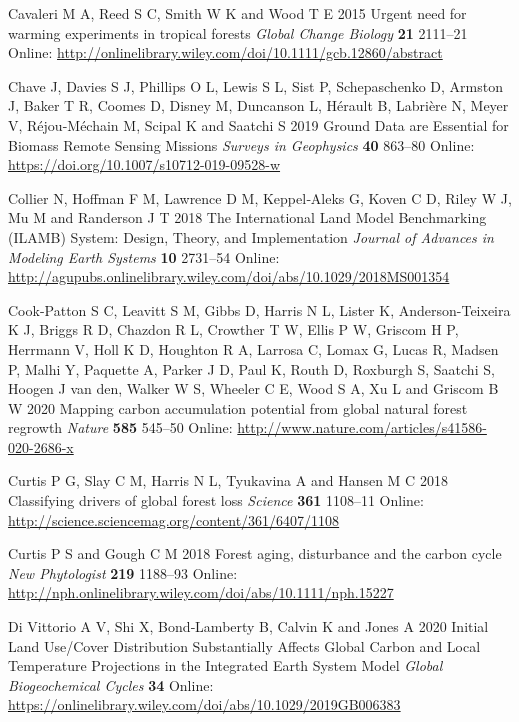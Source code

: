 \documentclass[
]{article}
\newlength{\cslhangindent}
\newenvironment{cslreferences}%
  {\setlength{\parindent}{0pt}%
  \everypar{\setlength{\hangindent}{\cslhangindent}}\ignorespaces}%
  {\par}
\begin{document}
\begin{cslreferences}
\leavevmode\hypertarget{ref-cavaleri_urgent_2015}{}%
Cavaleri M A, Reed S C, Smith W K and Wood T E 2015 Urgent need for
warming experiments in tropical forests \emph{Global Change Biology}
\textbf{21} 2111--21 Online:
\url{http://onlinelibrary.wiley.com/doi/10.1111/gcb.12860/abstract}

\leavevmode\hypertarget{ref-chave_ground_2019}{}%
Chave J, Davies S J, Phillips O L, Lewis S L, Sist P, Schepaschenko D,
Armston J, Baker T R, Coomes D, Disney M, Duncanson L, Hérault B,
Labrière N, Meyer V, Réjou-Méchain M, Scipal K and Saatchi S 2019 Ground
Data are Essential for Biomass Remote Sensing Missions \emph{Surveys in
Geophysics} \textbf{40} 863--80 Online:
\url{https://doi.org/10.1007/s10712-019-09528-w}

\leavevmode\hypertarget{ref-collier_international_2018}{}%
Collier N, Hoffman F M, Lawrence D M, Keppel‐Aleks G, Koven C D, Riley W
J, Mu M and Randerson J T 2018 The International Land Model Benchmarking
(ILAMB) System: Design, Theory, and Implementation \emph{Journal of
Advances in Modeling Earth Systems} \textbf{10} 2731--54 Online:
\url{http://agupubs.onlinelibrary.wiley.com/doi/abs/10.1029/2018MS001354}

\leavevmode\hypertarget{ref-cook-patton_mapping_2020}{}%
Cook-Patton S C, Leavitt S M, Gibbs D, Harris N L, Lister K,
Anderson-Teixeira K J, Briggs R D, Chazdon R L, Crowther T W, Ellis P W,
Griscom H P, Herrmann V, Holl K D, Houghton R A, Larrosa C, Lomax G,
Lucas R, Madsen P, Malhi Y, Paquette A, Parker J D, Paul K, Routh D,
Roxburgh S, Saatchi S, Hoogen J van den, Walker W S, Wheeler C E, Wood S
A, Xu L and Griscom B W 2020 Mapping carbon accumulation potential from
global natural forest regrowth \emph{Nature} \textbf{585} 545--50
Online: \url{http://www.nature.com/articles/s41586-020-2686-x}

\leavevmode\hypertarget{ref-curtis_classifying_2018}{}%
Curtis P G, Slay C M, Harris N L, Tyukavina A and Hansen M C 2018
Classifying drivers of global forest loss \emph{Science} \textbf{361}
1108--11 Online:
\url{http://science.sciencemag.org/content/361/6407/1108}

\leavevmode\hypertarget{ref-curtis_forest_2018}{}%
Curtis P S and Gough C M 2018 Forest aging, disturbance and the carbon
cycle \emph{New Phytologist} \textbf{219} 1188--93 Online:
\url{http://nph.onlinelibrary.wiley.com/doi/abs/10.1111/nph.15227}

\leavevmode\hypertarget{ref-di_vittorio_initial_2020}{}%
Di Vittorio A V, Shi X, Bond‐Lamberty B, Calvin K and Jones A 2020
Initial Land Use/Cover Distribution Substantially Affects Global Carbon
and Local Temperature Projections in the Integrated Earth System Model
\emph{Global Biogeochemical Cycles} \textbf{34} Online:
\url{https://onlinelibrary.wiley.com/doi/abs/10.1029/2019GB006383}


\end{cslreferences}
\end{document}
